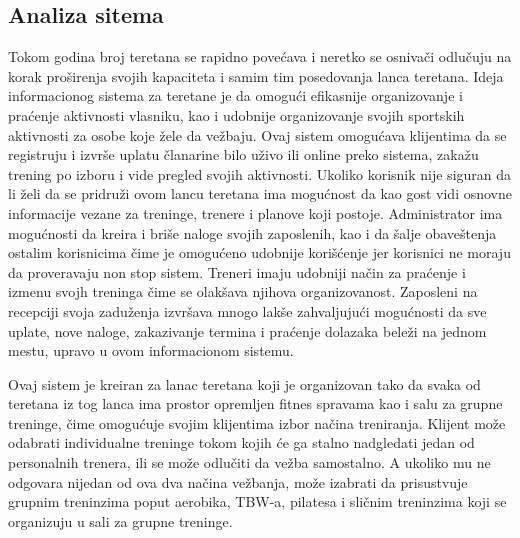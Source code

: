 \documentclass[../main.tex]{subfiles}
\begin{document}
\subsection{Analiza sitema}

Tokom godina broj teretana se rapidno povećava i neretko se osnivači odlučuju na korak proširenja svojih kapaciteta i samim tim posedovanja lanca teretana. Ideja informacionog sistema za teretane je da omogući efikasnije organizovanje i praćenje aktivnosti vlasniku, kao i udobnije organizovanje svojih sportskih aktivnosti za osobe koje žele da vežbaju. Ovaj sistem omogućava klijentima da se registruju i izvrše uplatu članarine bilo uživo ili online preko sistema, zakažu trening po izboru i vide pregled svojih aktivnosti. Ukoliko korisnik nije siguran da li želi da se pridruži ovom lancu teretana ima mogućnost da kao gost vidi osnovne informacije vezane za treninge, trenere i planove koji postoje. Administrator ima mogućnosti da kreira i briše naloge svojih zaposlenih, kao i da šalje obaveštenja ostalim korisnicima čime je omogućeno udobnije korišćenje jer korisnici ne moraju da proveravaju non stop sistem. Treneri imaju udobniji način za praćenje i izmenu svojh treninga čime se olakšava njihova organizovanost. Zaposleni na recepciji svoja zaduženja izvršava mnogo lakše zahvaljujući mogućnosti da sve uplate, nove naloge, zakazivanje termina i praćenje dolazaka beleži na jednom mestu, upravo u ovom informacionom sistemu.

Ovaj sistem je kreiran za lanac teretana koji je organizovan tako da svaka od teretana iz tog lanca ima prostor opremljen fitnes spravama kao i salu za grupne treninge, čime omogućuje svojim klijentima izbor načina treniranja. Klijent može odabrati individualne treninge tokom kojih će ga stalno nadgledati jedan od personalnih trenera, ili se može odlučiti da vežba samostalno. A ukoliko mu ne odgovara nijedan od ova dva načina vežbanja, može izabrati da prisustvuje grupnim treninzima poput aerobika, TBW-a, pilatesa i sličnim treninzima koji se organizuju u sali za grupne treninge. 
\end{document}
